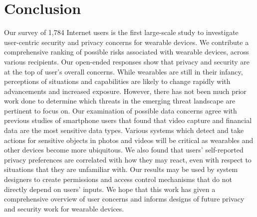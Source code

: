\documentclass[conference]{IEEEtran}
\begin{document}
\section{Conclusion}

 Our survey of 1,784 Internet users is the first large-scale study to investigate user-centric security and privacy concerns for wearable devices. We contribute a comprehensive ranking of possible risks associated with wearable devices, across various recipients. Our open-ended responses show that privacy and security are at the top of user's overall concerns. While wearables are still in their infancy, perceptions of situations and capabilities are likely to change rapidly with advancements and increased exposure. However, there has not been much prior work done to determine which threats in the emerging threat landscape are pertinent to focus on. Our examination of possible data concerns agree with previous studies of smartphone users that found that video capture and financial data are the most sensitive data types. Various systems which detect and take actions for sensitive objects in photos and videos will be critical as wearables and other devices become more ubiquitous. We also found that users' self-reported privacy preferences are correlated with how they may react, even with respect to situations that they are unfamiliar with. Our results may be used by system designers to create permissions and access control mechanisms that do not directly depend on users' inputs. We hope that this work has given a comprehensive overview of user concerns and informs designs of future privacy and security work for wearable devices. 


 





\end{document}

